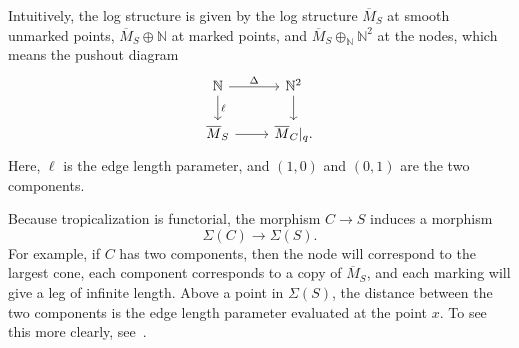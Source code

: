 \documentclass[10pt,oldfontcommands,oneside]{memoir}
\theoremstyle{definition}
\theoremstyle{remark}
\theoremstyle{plain}
\theoremstyle{definition}
\theoremstyle{remark}
\newcommand{\N}{\mathbb{N}}
\newcommand{\ol}[1]{\overline{#1}}
\newcommand{\1}{\mathbf{1}}
\newcommand{\2}{\mathbf{2}}
\newcommand{\3}{\mathbf{3}}
\begin{document}
Intuitively, the log structure is given by the log structure $\ol{M}_S$ at smooth unmarked points, $\ol{M}_S \oplus \N$ at marked points, and $\ol{M}_S \oplus_{\N} \N^2$ at the nodes, which means the pushout diagram
\begin{equation*}
\begin{tikzcd}
    \N \ar{r}{\Delta} \ar{d}{\ell} & \N^2 \ar{d} \\
    \ol{M}_S \ar{r} & \ol{M}_C|_q.
\end{tikzcd}
\end{equation*}
Here, $\ell$ is the edge length parameter, and $(1,0)$ and $(0,1)$ are the two components.

Because tropicalization is functorial, the morphism $C \to S$ induces a morphism
\[ \Sigma(C) \to \Sigma(S). \]
For example, if $C$ has two components, then the node will correspond to the largest cone, each component corresponds to a copy of $\ol{M}_S$, and each marking will give a leg of infinite length. Above a point in $\Sigma(S)$, the distance between the two components is the edge length parameter evaluated at the point $x$. To see this more clearly, see~.
\end{document}
